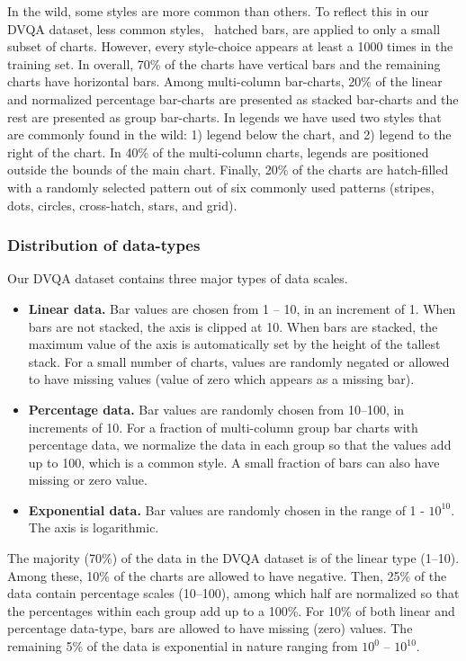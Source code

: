 \documentclass[10pt,twocolumn,letterpaper]{article}
\begin{document}
\begin{appendices}
In the wild, some styles are more common than others. To reflect this in our DVQA dataset, less common styles, \eg\ hatched bars, are applied to only a small subset of charts. However, every style-choice appears at least a 1000 times in the training set.
In overall, 70\% of the charts have vertical bars and the remaining charts have horizontal bars. Among multi-column bar-charts, 20\% of the linear and normalized percentage bar-charts are presented as stacked bar-charts and the rest are presented as group bar-charts. In legends we have used two styles that are commonly found in the wild: 1) legend below the chart, and 2) legend to the right of the chart. In 40\% of the multi-column charts, legends are positioned outside the bounds of the main chart.  Finally, 20\% of the charts are hatch-filled with a randomly selected pattern out of six commonly used patterns (stripes, dots, circles, cross-hatch, stars, and grid).

\subsubsection{Distribution of data-types}
Our DVQA dataset contains three major types of data scales.

\begin{itemize}[noitemsep,nolistsep]
\item \textbf{Linear data.} Bar values are chosen from 1 -- 10, in an increment of 1. When bars are not stacked, the axis is clipped at 10. When bars are stacked, the maximum value of the axis is automatically set by the height of the tallest stack. For a small number of charts, values are randomly negated or allowed to have missing values (\ie value of zero which appears as a missing bar).

\item \textbf{Percentage data.} Bar values are randomly chosen from 10--100, in increments of 10. For a fraction of multi-column group bar charts with percentage data, we normalize the data in each group so that the values add up to 100, which is a common style. A small fraction of bars can also have missing or zero value.

\item \textbf{Exponential data.} Bar values are randomly chosen in the range of 1 - $10^{10}$. The axis is logarithmic.
\end{itemize}

The majority (70\%) of the data in the DVQA dataset is of the linear type (1--10). Among these, 10\% of the charts are allowed to have negative. Then, 25\% of the data contain percentage scales (10--100), among which half are normalized so that the percentages within each group add up to a 100\%. For 10\% of both linear and percentage data-type, bars are allowed to have missing  (zero) values. The remaining 5\% of the data is exponential in nature ranging from $10^{0}$ -- $10^{10}$.


\end{appendices}
\end{document}
